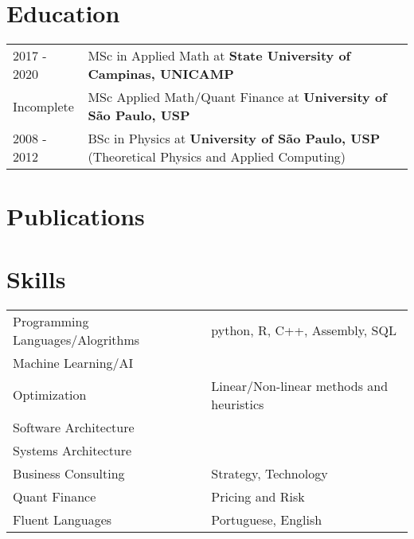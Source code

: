 \documentclass[a4paper,12pt]{article}
\begin{document}
\section{Education}
\begin{tabularx}{\linewidth}{@{}l X@{}}
2017 - 2020 & MSc in Applied Math at \textbf{State University of Campinas, UNICAMP} \\
Incomplete & MSc Applied Math/Quant Finance at \textbf{University of São Paulo, USP}  \\
2008 - 2012 & BSc in Physics at \textbf{University of São Paulo, USP} \hfill (Theoretical Physics and Applied Computing) \\
\end{tabularx}

\section{Publications}
\begin{refsection}
\nocite{*}
\printbibliography[heading=none]
\end{refsection}

\section{Skills}
\begin{tabularx}{\linewidth}{@{}l X@{}}
Programming Languages/Alogrithms &  \normalsize{python, R, C++, Assembly, SQL}\\
Machine Learning/AI &  \normalsize{}\\
Optimization &  \normalsize{Linear/Non-linear methods and heuristics}\\
Software Architecture &  \normalsize{}\\
Systems Architecture &  \normalsize{}\\
Business Consulting  &  \normalsize{Strategy, Technology}\\
Quant Finance &  \normalsize{Pricing and Risk}\\
Fluent Languages &  \normalsize{Portuguese, English}\\
\end{tabularx}

\vfill
{}
\end{document}
